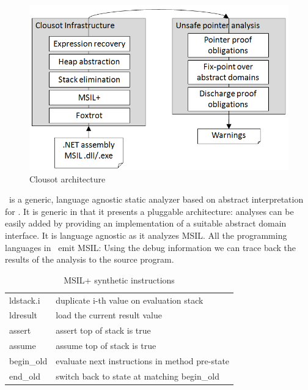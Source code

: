 \documentclass[10pt]{sigplanconf}
\begin{document}
\begin{figure}
  \includegraphics[width=\columnwidth]{clousotarchitecture.png}
  \caption{Clousot architecture}
  \label{fig:clousot-architecture}
\end{figure}




\Clousot\ is a generic, language agnostic static analyzer based on abstract interpretation for \NET.
It is generic in that it presents a pluggable architecture: analyses can be easily added by providing an implementation of a suitable abstract domain interface. 
It is language agnostic as it analyzes MSIL. 
All the programming languages in \NET\ emit MSIL:  Using the debug information we can trace back the results of the analysis to the source program.

\begin{table}[t]
  \begin{tabular}{l|l}
  ldstack.i & duplicate i-th value on evaluation stack
\\
  ldresult  & load the current result value
\\
  assert    & assert top of stack is true
\\
  assume    & assume top of stack is true
\\
  begin\_old & evaluate next instructions in method pre-state
\\
  end\_old   & switch back to state at matching begin\_old  
  \end{tabular}
  \caption{MSIL+ synthetic instructions}
  \label{tab:extended-msil}
\end{table}
\end{document}
